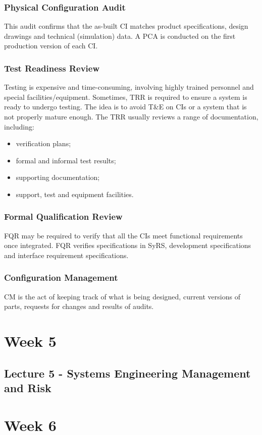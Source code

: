 \documentclass[journal]{IEEEtran}
\begin{document}
\subsubsection{\textbf{Physical Configuration Audit}}
This audit confirms that the as-built CI matches product specifications, design drawings and technical (simulation) data. A PCA is conducted on the first production version of each CI.
\subsubsection{\textbf{Test Readiness Review}}
Testing is expensive and time-consuming, involving highly trained personnel and special facilities/equipment. Sometimes, TRR is required to ensure a system is ready to undergo testing. The idea is to avoid T\&E on CIs or a system that is not properly mature enough. The TRR usually reviews a range of documentation, including:
\begin{itemize}
	\item verification plans;
	\item formal and informal test results;
	\item supporting documentation;
	\item support, test and equipment facilities.
\end{itemize}
\subsubsection{\textbf{Formal Qualification Review}}
FQR may be required to verify that all the CIs meet functional requirements once integrated. FQR verifies specifications in SyRS, development specifications and interface requirement specifications.
\subsubsection{\textbf{Configuration Management}}
CM is the act of keeping track of what is being designed, current versions of parts, requests for changes and results of audits.

\section{Week 5}
\subsection{\textbf{Lecture 5 - Systems Engineering Management and Risk}}

\section{Week 6}
\end{document}
